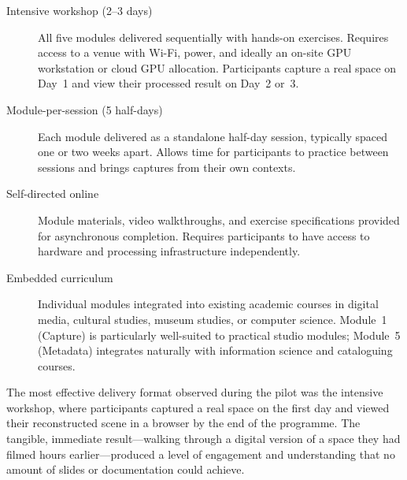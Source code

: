 \begin{description}
  \item[Intensive workshop (2--3 days)] All five modules delivered sequentially with hands-on exercises. Requires access to a venue with Wi-Fi, power, and ideally an on-site GPU workstation or cloud GPU allocation. Participants capture a real space on Day~1 and view their processed result on Day~2 or~3.

  \item[Module-per-session (5 half-days)] Each module delivered as a standalone half-day session, typically spaced one or two weeks apart. Allows time for participants to practice between sessions and brings captures from their own contexts.

  \item[Self-directed online] Module materials, video walkthroughs, and exercise specifications provided for asynchronous completion. Requires participants to have access to hardware and processing infrastructure independently.

  \item[Embedded curriculum] Individual modules integrated into existing academic courses in digital media, cultural studies, museum studies, or computer science. Module~1 (Capture) is particularly well-suited to practical studio modules; Module~5 (Metadata) integrates naturally with information science and cataloguing courses.
\end{description}

\begin{keyfinding}
The most effective delivery format observed during the pilot was the intensive workshop, where participants captured a real space on the first day and viewed their reconstructed scene in a browser by the end of the programme. The tangible, immediate result---walking through a digital version of a space they had filmed hours earlier---produced a level of engagement and understanding that no amount of slides or documentation could achieve.
\end{keyfinding}
